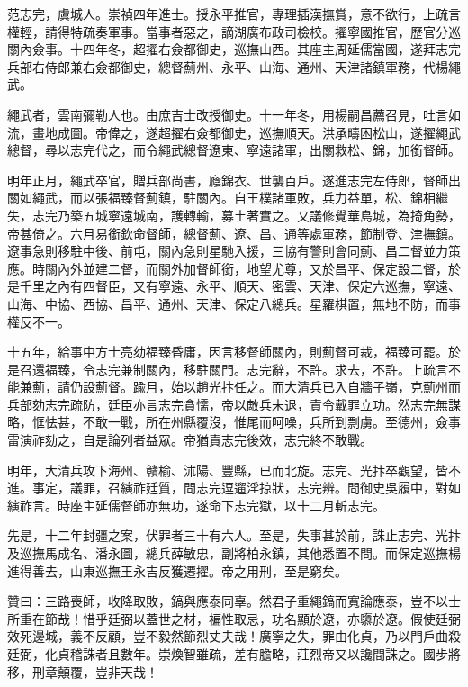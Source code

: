 \begin{pinyinscope}
范志完，虞城人。崇禎四年進士。授永平推官，專理插漢撫賞，意不欲行，上疏言權輕，請得特疏奏軍事。當事者惡之，謫湖廣布政司檢校。擢寧國推官，歷官分巡關內僉事。十四年冬，超擢右僉都御史，巡撫山西。其座主周延儒當國，遂拜志完兵部右侍郎兼右僉都御史，總督薊州、永平、山海、通州、天津諸鎮軍務，代楊繩武。

繩武者，雲南彌勒人也。由庶吉士改授御史。十一年冬，用楊嗣昌薦召見，吐言如流，畫地成圖。帝偉之，遂超擢右僉都御史，巡撫順天。洪承疇困松山，遂擢繩武總督，尋以志完代之，而令繩武總督遼東、寧遠諸軍，出關救松、錦，加銜督師。

明年正月，繩武卒官，贈兵部尚書，廕錦衣、世襲百戶。遂進志完左侍郎，督師出關如繩武，而以張福臻督薊鎮，駐關內。自王樸諸軍敗，兵力益單，松、錦相繼失，志完乃築五城寧遠城南，護轉輸，募土著實之。又議修覺華島城，為掎角勢，帝甚倚之。六月易銜欽命督師，總督薊、遼、昌、通等處軍務，節制登、津撫鎮。遼事急則移駐中後、前屯，關內急則星馳入援，三協有警則會同薊、昌二督並力策應。時關內外並建二督，而關外加督師銜，地望尤尊，又於昌平、保定設二督，於是千里之內有四督臣，又有寧遠、永平、順天、密雲、天津、保定六巡撫，寧遠、山海、中協、西協、昌平、通州、天津、保定八總兵。星羅棋置，無地不防，而事權反不一。

十五年，給事中方士亮劾福臻昏庸，因言移督師關內，則薊督可裁，福臻可罷。於是召還福臻，令志完兼制關內，移駐關門。志完辭，不許。求去，不許。上疏言不能兼薊，請仍設薊督。踰月，始以趙光抃任之。而大清兵已入自牆子嶺，克薊州而兵部劾志完疏防，廷臣亦言志完貪懦，帝以敵兵未退，責令戴罪立功。然志完無謀略，恇怯甚，不敢一戰，所在州縣覆沒，惟尾而呵噪，兵所到剽虜。至德州，僉事雷演祚劾之，自是論列者益眾。帝猶責志完後效，志完終不敢戰。

明年，大清兵攻下海州、贛榆、沭陽、豐縣，已而北旋。志完、光抃卒觀望，皆不進。事定，議罪，召縯祚廷質，問志完逗遛淫掠狀，志完辨。問御史吳履中，對如縯祚言。時座主延儒督師亦無功，遂命下志完獄，以十二月斬志完。

先是，十二年封疆之案，伏罪者三十有六人。至是，失事甚於前，誅止志完、光抃及巡撫馬成名、潘永圖，總兵薛敏忠，副將柏永鎮，其他悉置不問。而保定巡撫楊進得善去，山東巡撫王永吉反獲遷擢。帝之用刑，至是窮矣。

贊曰：三路喪師，收降取敗，鎬與應泰同辜。然君子重繩鎬而寬論應泰，豈不以士所重在節哉！惜乎廷弼以蓋世之材，褊性取忌，功名顯於遼，亦隳於遼。假使廷弼效死邊城，義不反顧，豈不毅然節烈丈夫哉！廣寧之失，罪由化貞，乃以門戶曲殺廷弼，化貞稽誅者且數年。崇煥智雖疏，差有膽略，莊烈帝又以讒間誅之。國步將移，刑章顛覆，豈非天哉！


\end{pinyinscope}